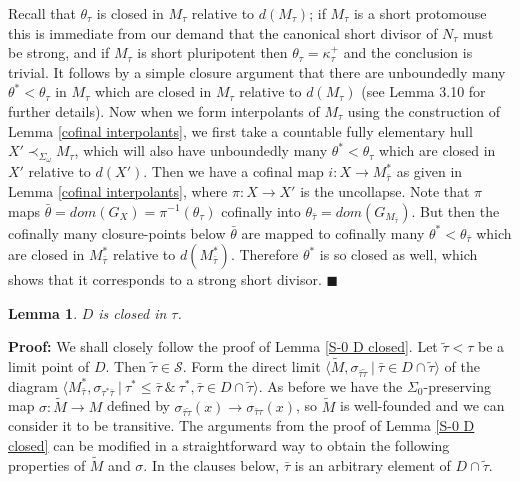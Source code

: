 \documentclass[12pt]{article}
\newtheorem{lem}[thm]{Lemma}
\begin{document}
Recall that $\theta_\tau$ is closed in $M_\tau$ relative to $d(M_\tau)$; if $M_\tau$ is a short protomouse this is immediate from our demand that the canonical short divisor of $N_\tau$ must be strong, and if $M_\tau$ is short pluripotent then $\theta_\tau = \kappa_\tau^+$ and the conclusion is trivial.  It follows by a simple closure argument that there are unboundedly many $\theta^* < \theta_\tau$ in $M_\tau$ which are closed in $M_\tau$ relative to $d(M_\tau)$ (see \cite{zeman square proof} Lemma 3.10 for further details).  Now when we form interpolants of $M_\tau$ using the construction of Lemma \ref{cofinal interpolants}, we first take a countable fully elementary hull $X' \prec_{\Sigma_\omega} M_\tau$, which will also have unboundedly many $\theta^* < \theta_\tau$ which are closed in $X'$ relative to $d(X')$.  Then we have a cofinal map $i : X \longrightarrow M^*_{\bar{\tau}}$ as given in Lemma \ref{cofinal interpolants}, where $\pi : X \longrightarrow X'$ is the uncollapse.  Note that $\pi$ maps $\bar{\theta} = dom (G_X) = \pi^{-1} ( \theta_\tau )$ cofinally into $\theta_{\bar{\tau}} = dom (G_{M_{\bar{\tau}}})$.  But then the cofinally many closure-points below $\bar{\theta}$ are mapped to cofinally many $\theta^* < \theta_{\bar{\tau}}$ which are closed in $M^*_{\bar{\tau}}$ relative to $d(M^*_{\bar{\tau}})$.  Therefore $\theta^*$ is so closed as well, which shows that it corresponds to a strong short divisor. $\blacksquare$\\






\begin{lem} \label{S-1 short D closed}
$D$ is closed in $\tau$.
\end{lem}

\textbf{Proof:}  We shall closely follow the proof of Lemma \ref{S-0 D closed}.  Let $\tilde{\tau} < \tau$ be a limit point of $D$.  Then $\tilde{\tau} \in \mathcal{S}$.  Form the direct limit $\langle \tilde{M} , \sigma_{\bar{\tau} \tilde{\tau}} \ | \ \bar{\tau} \in D \cap \tilde{\tau} \rangle$ of the diagram $\langle M_{\bar{\tau}}^* , \sigma_{\tau^* \bar{\tau}} \ | \ \tau^* \leq \bar{\tau} \ \& \ \tau^* , \bar{\tau} \in D \cap \tilde{\tau} \rangle$.  As before we have the $\Sigma_0$-preserving map $\sigma : \tilde{M} \longrightarrow M$ defined by $\sigma_{\bar{\tau} \tilde{\tau}} (x) \longrightarrow \sigma_{\bar{\tau} \tau} (x)$, so $\tilde{M}$ is well-founded and we can consider it to be transitive.  The arguments from the proof of Lemma \ref{S-0 D closed} can be modified in a straightforward way to obtain the following properties of $\tilde{M}$ and $\sigma$.  In the clauses below, $\bar{\tau}$ is an arbitrary element of $D \cap \tilde{\tau}$.
\end{document}

